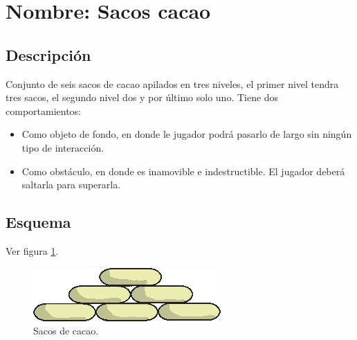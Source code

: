 \section{Nombre: Sacos cacao}\label{obs.saco}
\subsection{Descripción}
Conjunto de seis sacos de cacao apilados en tres niveles, el primer nivel tendra tres sacos, el segundo nivel dos y por último solo uno. Tiene dos comportamientos:
\begin{itemize}
	\item Como objeto de fondo, en donde le jugador podrá pasarlo de largo sin ningún tipo de interacción. 
	\item Como obstáculo, en donde es inamovible e indestructible. El jugador deberá saltarla para superarla.
\end{itemize}
\subsection{Esquema}
Ver figura \ref{fig:saco}.
\begin{figure}
	\centering
	\includegraphics[height=0.2 \textheight]{Imagenes/saco}
	\caption{Sacos de cacao.}
	\label{fig:saco}
\end{figure}